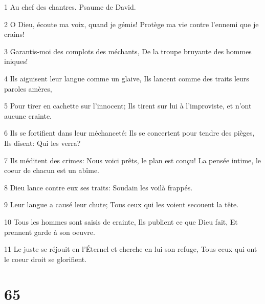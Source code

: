 \par 1 Au chef des chantres. Psaume de David.
\par 2 O Dieu, écoute ma voix, quand je gémis! Protège ma vie contre l'ennemi que je crains!
\par 3 Garantis-moi des complots des méchants, De la troupe bruyante des hommes iniques!
\par 4 Ils aiguisent leur langue comme un glaive, Ils lancent comme des traits leurs paroles amères,
\par 5 Pour tirer en cachette sur l'innocent; Ils tirent sur lui à l'improviste, et n'ont aucune crainte.
\par 6 Ils se fortifient dans leur méchanceté: Ils se concertent pour tendre des pièges, Ils disent: Qui les verra?
\par 7 Ils méditent des crimes: Nous voici prêts, le plan est conçu! La pensée intime, le coeur de chacun est un abîme.
\par 8 Dieu lance contre eux ses traits: Soudain les voilà frappés.
\par 9 Leur langue a causé leur chute; Tous ceux qui les voient secouent la tête.
\par 10 Tous les hommes sont saisis de crainte, Ils publient ce que Dieu fait, Et prennent garde à son oeuvre.
\par 11 Le juste se réjouit en l'Éternel et cherche en lui son refuge, Tous ceux qui ont le coeur droit se glorifient.

\chapter{65}

